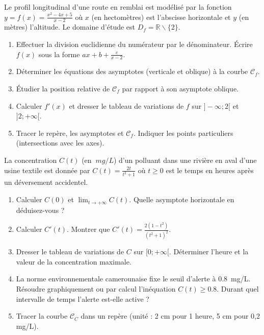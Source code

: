 \documentclass[11pt]{article}
\def\setminus{\mathbin{\backslash}}\let\smallsetminus\setminus
\begin{document}
\begin{exercice}
Le profil longitudinal d'une route en remblai est modélisé par la fonction $y = f(x) = \frac{x^2 - 4x + 5}{x - 2}$ où $x$ (en hectomètres) est l'abscisse horizontale et $y$ (en mètres) l'altitude. Le domaine d'étude est $D_f = \mathbb{R} \setminus \{2\}$.
\begin{enumerate}
    \item Effectuer la division euclidienne du numérateur par le dénominateur. Écrire $f(x)$ sous la forme $ax + b + \frac{c}{x-2}$.
    \item Déterminer les équations des asymptotes (verticale et oblique) à la courbe $\mathcal{C}_f$.
    \item Étudier la position relative de $\mathcal{C}_f$ par rapport à son asymptote oblique.
    \item Calculer $f'(x)$ et dresser le tableau de variations de $f$ sur $]-\infty; 2[$ et $]2; +\infty[$.
    \item Tracer le repère, les asymptotes et $\mathcal{C}_f$. Indiquer les points particuliers (intersections avec les axes).
\end{enumerate}
\end{exercice}

\begin{exercice}
La concentration $C(t)$ (en $\SI{}{mg/L}$) d'un polluant dans une rivière en aval d'une usine textile est donnée par $C(t) = \frac{2t}{t^2 + 1}$ où $t \geq 0$ est le temps en heures après un déversement accidentel.
\begin{enumerate}
    \item Calculer $C(0)$ et $\lim_{t \to +\infty} C(t)$. Quelle asymptote horizontale en déduisez-vous ?
    \item Calculer $C'(t)$. Montrer que $C'(t) = \frac{2(1-t^2)}{(t^2+1)^2}$.
    \item Dresser le tableau de variations de $C$ sur $[0; +\infty[$. Déterminer l'heure et la valeur de la concentration maximale.
    \item La norme environnementale camerounaise fixe le seuil d'alerte à \SI{0.8}{mg/L}. Résoudre graphiquement ou par calcul l'inéquation $C(t) \geq 0.8$. Durant quel intervalle de temps l'alerte est-elle active ?
    \item Tracer la courbe $\mathcal{C}_C$ dans un repère (unité : 2 cm pour 1 heure, 5 cm pour 0,2 mg/L).
\end{enumerate}
\end{exercice}
\end{document}
